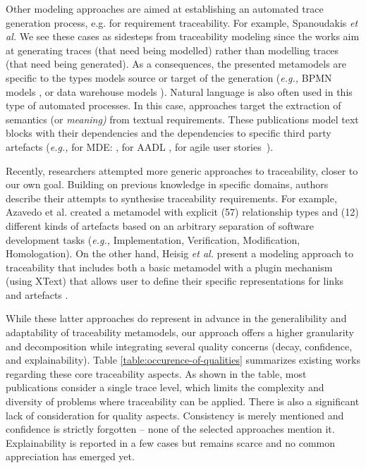 Other modeling approaches are aimed at establishing an automated trace generation process, e.g. for requirement traceability. For example, Spanoudakis \textit{et al.} 
We see these cases as sidesteps from traceability modeling since the works aim at generating traces (that need being modelled) rather than modelling traces (that need being generated). As a consequences, the presented metamodels are specific to the types models source or target of the generation  (\textit{e.g.,} BPMN models \cite{pavalkis2017-TIM-for-BPMN}, or data warehouse models \cite{mate2011-TIM-for-MDA-data-warehouses}).
Natural language is also often used in this type of automated processes. In this case, approaches  target the extraction of semantics (or \textit{meaning)} from textual requirements. These publications model text blocks with their dependencies and the dependencies to specific third party artefacts (\textit{e.g.,} for MDE: \cite{sannier2012-TIM-for-text-req-in-MDE}, for AADL \cite{wang2020-TIM-for-NL-to-AADL}, for agile user stories~\cite{carniel2018-TIM-for-Impact-analysis-agile}). 


Recently, researchers attempted more generic approaches to traceability, closer to our own goal. Building on previous knowledge in specific domains, authors describe their attempts to synthesise traceability requirements. For example, Azavedo et al. \cite{azevedo2019-traceability-metamodel-and-reference-model}  created a metamodel with explicit (57) relationship types and (12) different kinds of artefacts based on an arbitrary separation of software development tasks (\textit{e.g.,} Implementation, Verification, Modification, Homologation). 
On the other hand, Heisig \textit{et al.} present a modeling approach to traceability that includes both a basic metamodel with a plugin mechanism (using XText) that allows user to define their specific representations for links and artefacts \cite{heisig2019-generic-traceability-metamodel-end-to-end-capra}.

While these latter approaches do represent in advance in the generalibility and adaptability of traceability metamodels, our approach offers a higher granularity and decomposition while integrating several quality concerns (decay, confidence, and explainability). Table \ref{table:occurence-of-qualities} summarizes existing works regarding these core traceability aspects. As shown in the table, most publications consider a single trace level, which limits the complexity and diversity of problems where traceability can be applied. There is also a significant lack of consideration for quality aspects. Consistency is merely mentioned and confidence is strictly forgotten -- none of the selected approaches mention it. Explainability is reported in a few cases but remains scarce and no common appreciation has emerged yet. 

